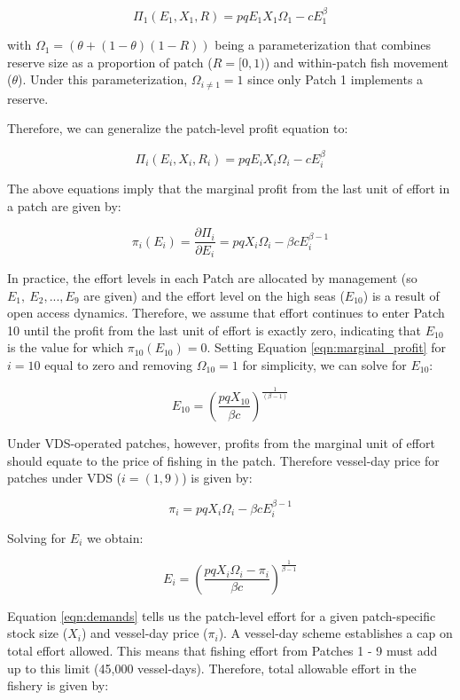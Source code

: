 \documentclass[12pt]{article}
\begin{document}
$$
\Pi_1(E_1,X_1,R) = pqE_1X_1\Omega_1-cE_1^\beta
$$

\noindent with $\Omega_1 = (\theta + (1 - \theta)(1 - R))$ being a parameterization that combines reserve size as a proportion of patch ($R =  [0, 1)$) and within-patch fish movement ($\theta$). Under this parameterization, $\Omega_{i \neq 1} = 1$ since only Patch 1 implements a reserve.

Therefore, we can generalize the patch-level profit equation to:

$$
\Pi_i(E_i,X_i, R_i) = pqE_iX_i\Omega_i-cE_i^\beta
$$

\noindent The above equations imply that the marginal profit from the last unit of effort in a patch are given by:

\begin{equation}
\pi_i(E_i) = \frac{\partial \Pi_i}{\partial E_i} = pqX_i\Omega_i - \beta cE_i^{\beta-1}
\label{eqn:marginal_profit}
\end{equation}

In practice, the effort levels in each Patch are allocated by management (so $E_{1},\ E_{2},...,E_{9}$ are given) and the effort level on the high seas ($E_{10}$) is a result of open access dynamics. Therefore, we assume that effort continues to enter Patch 10 until the profit from the last unit of effort is exactly zero, indicating that $E_{10}$ is the value for which $\pi_{10}(E_{10})  = 0$. Setting Equation \ref{eqn:marginal_profit} for $i = 10$ equal to zero and removing $\Omega_{10} = 1$ for simplicity, we can solve for $E_{10}$:

\begin{equation}
E_{10} = \left(\frac{pqX_{10}}{\beta c}\right)^{\frac{1}{(\beta - 1)}}
\label{eqn:effort_hs}
\end{equation}

Under VDS-operated patches, however, profits from the marginal unit of effort should equate to the price of fishing in the patch. Therefore vessel-day price for patches under VDS ($i = (1, 9)$) is  given by:

$$
\pi_i = pqX_i\Omega_i - \beta c E_i ^{\beta - 1}
$$

\noindent Solving for $E_i$ we obtain:

\begin{equation}
E_i = \left(\frac{pqX_i\Omega_i - \pi_i}{\beta c }\right) ^ {\frac{1}{\beta - 1}}
\label{eqn:demands}
\end{equation}

Equation \ref{eqn:demands} tells us the patch-level effort for a given patch-specific stock size ($X_i$) and vessel-day price ($\pi_i$). A vessel-day scheme establishes a cap on total effort allowed. This means that fishing effort from Patches 1 - 9 must add up to this limit (45,000 vessel-days). Therefore, total allowable effort in the fishery is given by:
\end{document}
